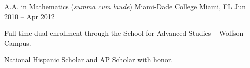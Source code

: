 \begin{cventries}
    \cventry
    {A.A. in Mathematics (\textit{summa cum laude})} %
    {Miami-Dade College} %
    {Miami, FL} %
    {Jun 2010 -- Apr 2012} %
    {
        \begin{cvitems} %
        \item{Full-time dual enrollment through the School for Advanced Studies -- Wolfson Campus.}
        \item{National Hispanic Scholar and AP Scholar with honor.}
        \end{cvitems}
    }


\end{cventries}
